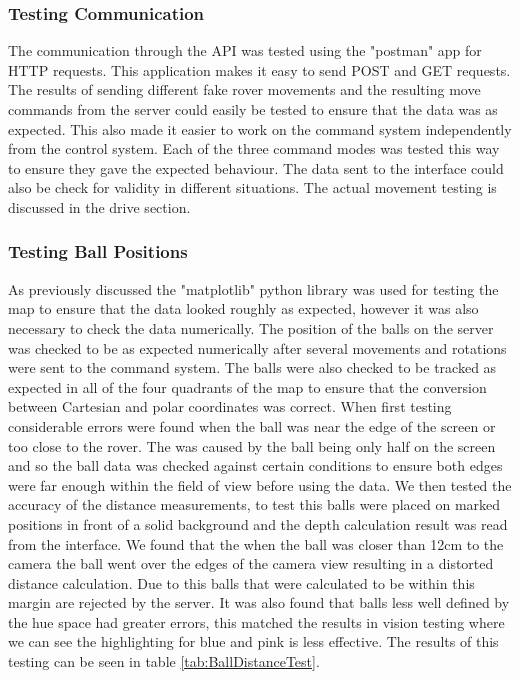 \documentclass[10pt,twoside]{article}
\begin{document}
\subsubsection{Testing Communication}
The communication through the API was tested using the "postman" app for HTTP requests. This application makes it easy to send POST and GET requests. The results of sending different fake rover movements and the resulting move commands from the server could easily be tested to ensure that the data was as expected. This also made it easier to work on the command system independently from the control system. Each of the three command modes was tested this way to ensure they gave the expected behaviour. The data sent to the interface could also be check for validity in different situations. The actual movement testing is discussed in the drive section.

\subsubsection{Testing Ball Positions}
As previously discussed the "matplotlib" python library was used for testing the map to ensure that the data looked roughly as expected, however it was also necessary to check the data numerically. The position of the balls on the server was checked to be as expected numerically after several movements and rotations were sent to the command system. The balls were also checked to be tracked as expected in all of the four quadrants of the map to ensure that the conversion between Cartesian and polar coordinates was correct. When first testing considerable errors were found when the ball was near the edge of the screen or too close to the rover. The was caused by the ball being only half on the screen and so the ball data was checked against certain conditions to ensure both edges were far enough within the field of view before using the data. We then tested the accuracy of the distance measurements, to test this balls were placed on marked positions in front of a solid background and the depth calculation result was read from the interface. We found that the when the ball was closer than 12cm to the camera the ball went over the edges of the camera view resulting in a distorted distance calculation. Due to this balls that were calculated to be within this margin are rejected by the server. It was also found that balls less well defined by the hue space had greater errors, this matched the results in vision testing where we can see the highlighting for blue and pink is less effective. The results of this testing can be seen in table \ref{tab:BallDistanceTest}.
\end{document}
